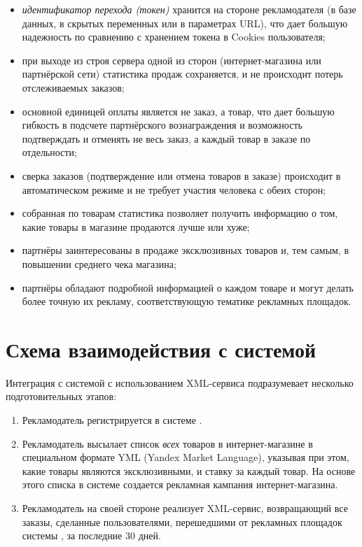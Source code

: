\documentclass[a4paper,12pt]{article}
\begin{document}
\begin{itemize}
\item \textit{идентификатор перехода (токен)} хранится на стороне рекламодателя (в базе данных, в скрытых переменных или в параметрах URL), что дает большую надежность по сравнению с хранением токена в Cookies пользователя;
\item при выходе из строя сервера одной из сторон (интернет-магазина или партнёрской сети) статистика продаж сохраняется, и не происходит потерь отслеживаемых заказов;
\item основной единицей оплаты является не заказ, а товар, что дает большую гибкость в подсчете партнёрского вознаграждения и возможность подтверждать и отменять не весь заказ, а каждый товар в заказе по отдельности;
\item сверка заказов (подтверждение или отмена товаров в заказе) происходит в автоматическом режиме и не требует участия человека с обеих сторон;
\item собранная по товарам статистика позволяет получить информацию о том, какие товары в магазине продаются лучше или хуже;
\item партнёры заинтересованы в продаже эксклюзивных товаров и, тем самым, в повышении среднего чека магазина;
\item партнёры обладают подробной информацией о каждом товаре и могут делать более точную их рекламу, соответствующую тематике рекламных площадок.
\end{itemize}

\section{Схема взаимодействия с системой \heymoose}

Интеграция с системой \heymoose{} с использованием XML-сервиса подразумевает несколько подготовительных этапов:
\begin{enumerate}
\item Рекламодатель регистрируется в системе \heymoose{}.
\item Рекламодатель высылает список \textit{всех} товаров в интернет-магазине в специальном формате YML (Yandex Market Language), указывая при этом, какие товары являются эксклюзивными, и ставку за каждый товар. На основе этого списка в системе \heymoose{} создается рекламная кампания интернет-магазина.
\item Рекламодатель на своей стороне реализует XML-сервис, возвращающий все заказы, сделанные пользователями, перешедшими от рекламных площадок системы \heymoose{}, за последние 30 дней.
\end{enumerate}
\end{document}
